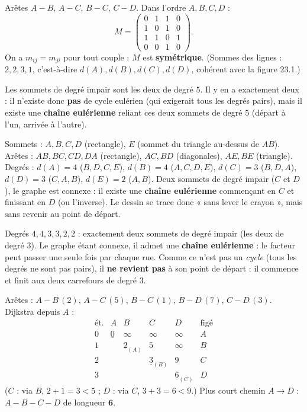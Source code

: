Arêtes $A\!-\!B$, $A\!-\!C$, $B\!-\!C$, $C\!-\!D$. Dans l'ordre $A,B,C,D$ :
\[
M=\begin{pmatrix}0&1&1&0\\1&0&1&0\\1&1&0&1\\0&0&1&0\end{pmatrix}.
\]
On a $m_{ij}=m_{ji}$ pour tout couple : $M$ est \textbf{symétrique}. (Sommes des lignes :
$2,2,3,1$, c'est-à-dire $d(A),d(B),d(C),d(D)$, cohérent avec la figure 23.1.)

Les sommets de degré impair sont les deux de degré $5$. Il y en a exactement deux : il
n'existe donc \textbf{pas} de cycle eulérien (qui exigerait tous les degrés pairs), mais il
existe une \textbf{chaîne eulérienne} reliant ces deux sommets de degré $5$ (départ à l'un,
arrivée à l'autre).

Sommets : $A,B,C,D$ (rectangle), $E$ (sommet du triangle au-dessus de $AB$). Arêtes :
$AB,BC,CD,DA$ (rectangle), $AC,BD$ (diagonales), $AE,BE$ (triangle). Degrés :
$d(A)=4$ ($B,D,C,E$), $d(B)=4$ ($A,C,D,E$), $d(C)=3$ ($B,D,A$), $d(D)=3$ ($C,A,B$),
$d(E)=2$ ($A,B$). Deux sommets de degré impair ($C$ et $D$), le graphe est connexe : il
existe une \textbf{chaîne eulérienne} commençant en $C$ et finissant en $D$ (ou l'inverse).
Le dessin se trace donc « sans lever le crayon », mais sans revenir au point de départ.

Degrés $4,4,3,3,2,2$ : exactement deux sommets de degré impair (les deux de degré $3$). Le
graphe étant connexe, il admet une \textbf{chaîne eulérienne} : le facteur peut passer une
seule fois par chaque rue. Comme ce n'est pas un \emph{cycle} (tous les degrés ne sont pas
pairs), il \textbf{ne revient pas} à son point de départ : il commence et finit aux deux
carrefours de degré $3$.

Arêtes : $A\!-\!B\,(2)$, $A\!-\!C\,(5)$, $B\!-\!C\,(1)$, $B\!-\!D\,(7)$, $C\!-\!D\,(3)$.
Dijkstra depuis $A$ :
\[
\begin{array}{c|cccc|l}
\text{ét.} & A & B & C & D & \text{figé}\\\hline
0 & \underline{0} & \infty & \infty & \infty & A\\
1 & & \underline{2}_{(A)} & 5 & \infty & B\\
2 & & & \underline{3}_{(B)} & 9 & C\\
3 & & & & \underline{6}_{(C)} & D
\end{array}
\]
($C$ : via $B$, $2+1=3<5$ ; $D$ : via $C$, $3+3=6<9$.) Plus court chemin
$A\to D$ : $A-B-C-D$ de longueur $\mathbf{6}$.


